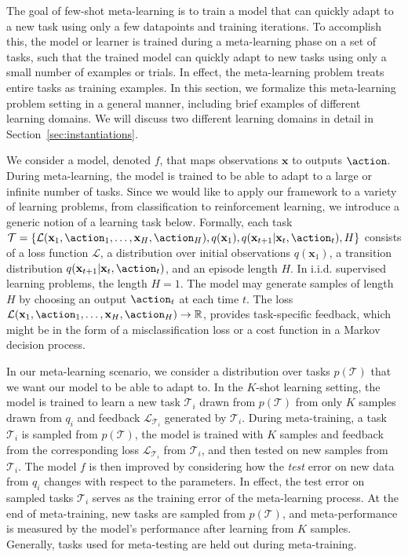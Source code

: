 \documentclass{article}
\begin{document}
\newcommand{\task}{\mathcal{T}}
\newcommand{\loss}{\mathcal{L}}
\newcommand{\inp}{\mathbf{x}}
\newcommand{\learner}{f}
\newcommand{\lossi}{\loss_{\task_i}}

The goal of few-shot meta-learning
is to train a model that can quickly adapt to a new task using only a few datapoints and training iterations.
To accomplish this, the model or learner is trained during a meta-learning phase on a set of tasks, such that the trained model can quickly adapt to new tasks using only a small number of examples or trials.
In effect, the meta-learning problem treats entire tasks as training examples.
In this section, we formalize this meta-learning problem setting in a general manner, including brief examples of different learning domains.
We will discuss two different learning domains in detail in Section~\ref{sec:instantiations}.



We consider a model, denoted $\learner$, that maps observations $\inp$ to outputs $\action$.
During meta-learning, the model
is trained to be able to adapt to a large or infinite number of tasks.
Since we would like to apply our framework to a variety of learning problems, from classification to reinforcement learning, we introduce a generic notion of a learning task below.
Formally, each task $\task = \{ \loss(\inp_1,\action_1,\dots,\inp_H,\action_H), q(\inp_1), q(\inp_{t+1} | \inp_t, \action_t), H  \}$
consists of a loss function $\loss$, a distribution over initial observations $q(\inp_1)$, a transition distribution $ q(\inp_{t+1} | \inp_t, \action_t)$, and an episode length $H$. In i.i.d. supervised learning problems, the length $H\!=\!1$.
The model may generate samples of length $H$ by choosing an output $\action_t$ at each time $t$. 
The loss $\loss(\inp_1,\action_1,\dots,\inp_H,\action_H)\rightarrow \mathbb{R}$, provides task-specific feedback, which might be in the form of a misclassification loss or a cost function in a Markov decision process.




In our meta-learning scenario, we consider a distribution over tasks $p(\task)$ that we want our model to be able to adapt to.
In the $K$-shot learning setting, the model is trained to learn a new task $\task_i$ drawn from $p(\task)$ from only $K$ samples drawn from $q_i$ and feedback $\lossi$ generated by $\task_i$.
During meta-training, a task $\task_i$ is sampled from $p(\task)$, the model is trained with $K$ samples and feedback from the corresponding loss $\lossi$ from $\task_i$, and then tested on new samples from $\task_i$.
The model $\learner$ is then improved by considering how the \emph{test} error on new data from $q_i$ changes with respect to the parameters. In effect, the test error on sampled tasks $\task_i$ serves as the training error of the meta-learning process.
At the end of meta-training, new tasks are sampled from $p(\task)$,
and meta-performance is measured by the model's performance after learning from $K$ samples.
Generally, tasks used for meta-testing are held out during meta-training.
\end{document}
